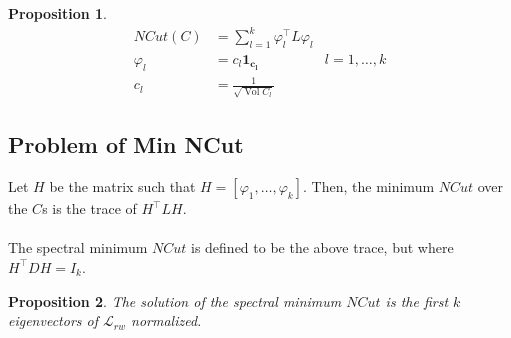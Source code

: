 \documentclass[12pt]{article}
\theoremstyle{plain}
\newtheorem*{proposition}{Proposition}
\DeclareMathOperator*{\vol}{Vol}
\begin{document}
\begin{proposition}
  \begin{align*}
    NCut(C) &= \sum_{l = 1}^{k} \varphi_l^{\intercal} L \varphi_{l} \\
    \varphi_l &= c_{l} \mathbf{1_{c_{l}}} & l = 1, \ldots, k \\
    c_l &= \frac{1}{\sqrt{\vol{C_l}}}
  \end{align*}
\end{proposition}

\subsection{Problem of Min NCut}

Let $ H $ be the matrix such that $ H = [\varphi_1, \ldots, \varphi_k] $.
Then, the minimum $ NCut $ over the $ C $s is the trace of $ H^{\intercal} L H $.
\\ \\
The spectral minimum $ NCut $ is defined to be the above trace, but where $ H^{\intercal} D H = I_{k} $.
\begin{proposition}
  The solution of the spectral minimum $ NCut $ is the first $ k $ eigenvectors of $ \mathcal{L}_{rw} $ normalized.
\end{proposition}
\end{document}
